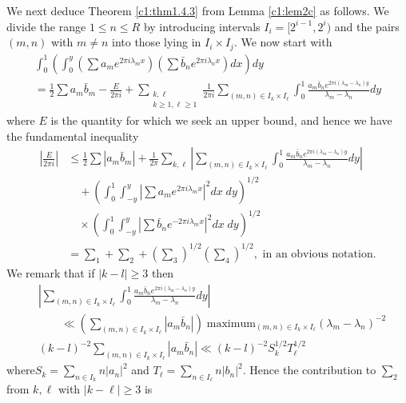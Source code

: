 We next deduce Theorem \ref{c1:thm1.4.3} from Lemma \ref{c1:lem2c} as follows. We divide the range $1 \leq n \leq R$ by introducing intervals $I_i = [2^{i-1}, 2^i)$ and the pairs $(m,n)$ with $m \neq n$ into those lying in $I_i \times I_j$. We now start with
\begin{gather*}
\int^1_0 \left(\int^y_0 \left(\sum a_m e^{2\pi i \lambda_m x} \right) \left(\sum \bar{b}_n e^{2\pi i \lambda_n x} \right) dx \right) dy\\
= \frac{1}{2} \sum a_m \bar{b}_m - \frac{E}{2 \pi i} + \sum\limits_{\substack{k, \ell\\k \geq 1, \ell \geq 1}} \frac{1}{2\pi i} \sum\limits_{(m,n) \in I_k \times I_{\ell}} \int^1_0 \frac{a_m \bar{b}_n e^{2\pi i (\lambda_m - \lambda_n) y} }{\lambda_m - \lambda_n}dy
\end{gather*}
where $E$ is the quantity for which we seek an upper bound, and hence we have the fundamental inequality
\begin{align*}
\left|\frac{E}{2\pi i} \right| & \leq   \frac{1}{2} \sum |a_m \bar{b}_m| + \frac{1}{2\pi } \sum\limits_{k,\ell} \left| \sum\limits_{(m,n) \in I_k \times I_\ell} \int^1_0 \frac{a_m \bar{b}_n e^{2\pi i (\lambda_m - \lambda_n) y}}{\lambda_m - \lambda_n} dy \right|\\
& \quad + \left( \int^1_0 \int^y_{-y} |\sum a_m e^{2\pi i \lambda_m x}|^2 dx \; dy\right)^{1/2}\\
& \quad \times \left( \int^1_0 \int^y_{-y} |\sum \bar{b}_n e^{-2\pi i \lambda_m x}|^2 dx \; dy\right)^{1/2}\\
& = \sum_1 + \sum_2 + \left(\sum_3 \right)^{1/2} \left(\sum_4 \right)^{1/2}, \text{ in an obvious notation}.
\end{align*}
We remark that if $|k-l| \geq 3$ then 
\begin{align*}
&\left| \sum\limits_{(m,n) \in I_k \times I_\ell} \int^1_0 \frac{a_m \bar{b}_n e^{2 \pi i (\lambda_m - \lambda_n) y}}{\lambda_m -\lambda_n} dy \right|\\
& \qquad \ll \left(\sum\limits_{(m,n) \in I_k \times I_{\ell}} |a_m \bar{b}_n| \right) \;  \text{maximum}_{(m,n) \in I_k \times I_{\ell} }(\lambda_m - \lambda_n)^{-2}\\
& (k-l)^{-2} \sum\limits_{(m,n) \in I_k \times I_{\ell}} |a_m \bar{b}_n| \ll (k-l)^{-2} S^{1/2}_k T^{1/2}_{\ell}
\end{align*}
where\pageoriginale $S_k = \sum\limits_{n \in I_k} n |a_n|^2$ and
$T_{\ell} = \sum\limits_{n \in I_{\ell}} n |b_n|^2$. Hence the
contribution to $\sum_2$ from $k,\ell$ with $|k-\ell| \geq 3$ is

